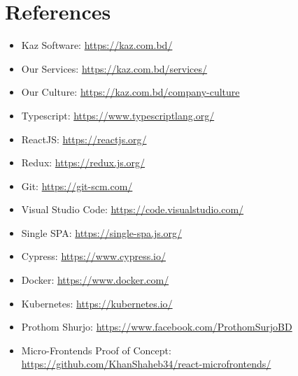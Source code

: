 \chapter{References}

\begin{itemize}
    \item Kaz Software: \url{https://kaz.com.bd/}
    \item Our Services: \url{https://kaz.com.bd/services/}
    \item Our Culture: \url{https://kaz.com.bd/company-culture}
    \item Typescript: \url{https://www.typescriptlang.org/}
    \item ReactJS: \url{https://reactjs.org/}
    \item Redux: \url{https://redux.js.org/}
    \item Git: \url{https://git-scm.com/}
    \item Visual Studio Code: \url{https://code.visualstudio.com/}
    \item Single SPA: \url{https://single-spa.js.org/}
    \item Cypress: \url{https://www.cypress.io/}
    \item Docker: \url{https://www.docker.com/}
    \item Kubernetes: \url{https://kubernetes.io/}
    \item Prothom Shurjo: \url{https://www.facebook.com/ProthomSurjoBD}
    \item Micro-Frontends Proof of Concept: \\\url{https://github.com/KhanShaheb34/react-microfrontends/}
\end{itemize}